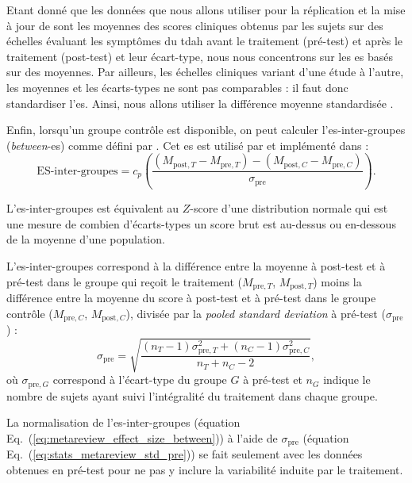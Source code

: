 Etant donné que les données que nous allons utiliser pour la réplication et la mise à jour de \citet{Cortese2016} sont les moyennes des 
scores cliniques obtenus par les sujets sur des échelles évaluant les symptômes du \gls{tdah} avant le traitement (pré-test) et 
après le traitement (post-test) et leur écart-type, nous nous concentrons sur 
les \gls{es} basés sur des moyennes. Par ailleurs, les échelles cliniques variant 
d'une étude à l'autre, les moyennes et les écarts-types ne sont pas comparables : il faut donc standardiser l'\gls{es}. 
Ainsi, nous allons utiliser la différence moyenne standardisée \citep{Cortese2016, Micoulaud2014}.

Enfin, lorsqu'un groupe contrôle est disponible, on peut calculer l'\gls{es}-inter-groupes (\textit{between}-\gls{es}) comme défini par \citet{Morris2008}.
Cet \gls{es} est utilisé par \citet{Cortese2016, Micoulaud2014} et implémenté dans \citet{Bussalb2019clinical} :
\begin{equation}
\label{eq:metareview_effect_size_between}
\text{ES-inter-groupes} = c_p \left(\frac{(M_{\text{post},T} - M_{\text{pre},T}) - (M_{\text{post},C} - M_{\text{pre},C}) }{\sigma_{\text{pre}}} \right).
\end{equation} 

L'\gls{es}-inter-groupes est équivalent au $Z$-score d'une distribution normale qui est une mesure de combien d'écarts-types un score brut est au-dessus ou en-dessous
de la moyenne d'une population. 

L'\gls{es}-inter-groupes correspond à la différence entre la moyenne à post-test et à pré-test 
dans le groupe qui reçoit le traitement ($M_{\text{pre},T}$, $M_{\text{post},T}$) moins la différence entre la moyenne du score à post-test et à pré-test 
dans le groupe contrôle ($M_{\text{pre},C}$, $M_{\text{post},C}$), divisée par la \textit{pooled standard deviation} à pré-test ($\sigma_{\text{pre}}$) :
\begin{equation}
\label{eq:stats_metareview_std_pre}
\sigma_{\text{pre}} = \sqrt{\frac{(n_T - 1)\sigma_{\text{pre},T}^2 + (n_C - 1)\sigma_{\text{pre},C}^2} {n_T + n_C - 2}},
\end{equation}
où $\sigma_{\text{pre},G}$ correspond à l'écart-type du groupe $G$ à pré-test et $n_G$ indique le nombre de sujets ayant suivi l'intégralité 
du traitement dans chaque groupe.

La normalisation de l'\gls{es}-inter-groupes (équation Eq.~(\ref{eq:metareview_effect_size_between})) à l'aide de $\sigma_{\text{pre}}$ 
(équation Eq.~(\ref{eq:stats_metareview_std_pre})) se fait seulement avec les données obtenues en pré-test pour ne pas y inclure la variabilité 
induite par le traitement.

